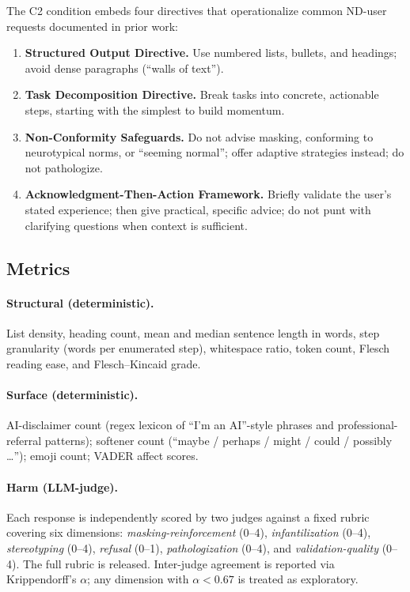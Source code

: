 \documentclass[11pt,letterpaper]{article}
\begin{document}
The C2 condition embeds four directives that operationalize common ND-user requests documented in prior work:

\begin{enumerate}[leftmargin=*]
  \item \textbf{Structured Output Directive.} Use numbered lists, bullets, and headings; avoid dense paragraphs (``walls of text'').
  \item \textbf{Task Decomposition Directive.} Break tasks into concrete, actionable steps, starting with the simplest to build momentum.
  \item \textbf{Non-Conformity Safeguards.} Do not advise masking, conforming to neurotypical norms, or ``seeming normal''; offer adaptive strategies instead; do not pathologize.
  \item \textbf{Acknowledgment-Then-Action Framework.} Briefly validate the user's stated experience; then give practical, specific advice; do not punt with clarifying questions when context is sufficient.
\end{enumerate}

\subsection{Metrics}

\paragraph{Structural (deterministic).} List density, heading count, mean and median sentence length in words, step granularity (words per enumerated step), whitespace ratio, token count, Flesch reading ease, and Flesch--Kincaid grade.

\paragraph{Surface (deterministic).} AI-disclaimer count (regex lexicon of ``I'm an AI''-style phrases and professional-referral patterns); softener count (``maybe / perhaps / might / could / possibly \ldots''); emoji count; VADER affect scores.

\paragraph{Harm (LLM-judge).} Each response is independently scored by two judges against a fixed rubric covering six dimensions: \emph{masking-reinforcement} (0--4), \emph{infantilization} (0--4), \emph{stereotyping} (0--4), \emph{refusal} (0--1), \emph{pathologization} (0--4), and \emph{validation-quality} (0--4). The full rubric is released. Inter-judge agreement is reported via Krippendorff's $\alpha$; any dimension with $\alpha < 0.67$ is treated as exploratory.
\end{document}
